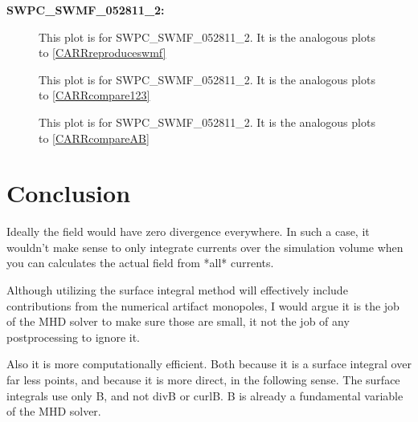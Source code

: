 \documentclass{article}
\begin{document}
\textbf{SWPC\_SWMF\_052811\_2:}

\begin{figure}[H]
  \caption{
  This plot is for SWPC\_SWMF\_052811\_2.
  It is the analogous plots to \ref{CARRreproduceswmf}
  }
  \label{SWPCreproduceswmf}
\end{figure}

\begin{figure}[H]
  \caption{
  This plot is for SWPC\_SWMF\_052811\_2.
  It is the analogous plots to \ref{CARRcompare123}
  }
  \label{SWPCcompare123}
\end{figure}

\begin{figure}[H]
  \caption{
  This plot is for SWPC\_SWMF\_052811\_2.
  It is the analogous plots to \ref{CARRcompareAB}
  }
  \label{SWPCcompareAB}
\end{figure}

\section{Conclusion}

Ideally the field would have zero divergence everywhere.
In such a case, it wouldn't make sense to only integrate currents over the simulation volume when you can calculates the actual field from *all* currents.

Although utilizing the surface integral method will effectively include contributions from the numerical artifact monopoles, I would argue it is the job of the MHD solver to make sure those are small, it not the job of any postprocessing to ignore it.

Also it is more computationally efficient. Both because it is a surface integral over far less points,
and because it is more direct, in the following sense. The surface integrals
use only B, and not divB or curlB. B is already a fundamental variable of the MHD solver.
\end{document}
